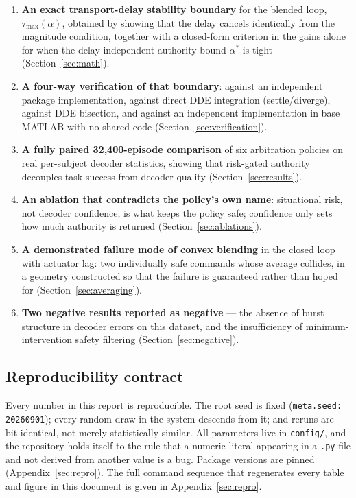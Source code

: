 \documentclass[11pt,a4paper]{article}
\newcommand{\astar}{\alpha^{*}}
\theoremstyle{plain}
\theoremstyle{definition}
\begin{document}
\begin{enumerate}
\item \textbf{An exact transport-delay stability boundary} for the
blended loop, $\tau_{\max}(\alpha)$, obtained by showing that the delay
cancels identically from the magnitude condition, together with a
closed-form criterion in the gains alone for when the delay-independent
authority bound $\astar$ is tight (Section~\ref{sec:math}).

\item \textbf{A four-way verification of that boundary}: against an
independent package implementation, against direct DDE integration
(settle/diverge), against DDE bisection, and against an independent
implementation in base MATLAB with no shared code
(Section~\ref{sec:verification}).

\item \textbf{A fully paired 32{,}400-episode comparison} of six
arbitration policies on real per-subject decoder statistics, showing
that risk-gated authority decouples task success from decoder quality
(Section~\ref{sec:results}).

\item \textbf{An ablation that contradicts the policy's own name}:
situational risk, not decoder confidence, is what keeps the policy safe;
confidence only sets how much authority is returned
(Section~\ref{sec:ablations}).

\item \textbf{A demonstrated failure mode of convex blending} in the
closed loop with actuator lag: two individually safe commands whose
average collides, in a geometry constructed so that the failure is
guaranteed rather than hoped for (Section~\ref{sec:averaging}).

\item \textbf{Two negative results reported as negative} --- the absence
of burst structure in decoder errors on this dataset, and the
insufficiency of minimum-intervention safety filtering
(Section~\ref{sec:negative}).
\end{enumerate}

\subsection{Reproducibility contract}

Every number in this report is reproducible. The root seed is fixed
(\texttt{meta.seed: 20260901}); every random draw in the system descends
from it; and reruns are bit-identical, not merely statistically similar.
All parameters live in \texttt{config/}, and the repository holds itself
to the rule that a numeric literal appearing in a \texttt{.py} file and
not derived from another value is a bug. Package versions are pinned
(Appendix~\ref{sec:repro}). The full command sequence that regenerates
every table and figure in this document is given in
Appendix~\ref{sec:repro}.
\end{document}
